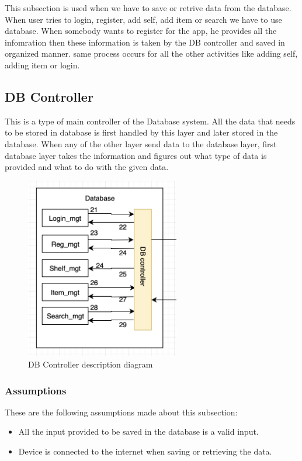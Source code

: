 This subsection is used when we have to save or retrive data from the database. When user tries to login, register, add self, add item or search we have to use database. When somebody wants to register for the app, he provides all the infomration then these information is taken by the DB controller and saved in organized manner. same process occurs for all the other activities like adding self, adding item or login.
\subsection{DB Controller}
This is a type of main controller of the Database system. All the data that needs to be stored in database is first handled by this layer and later stored in the database. When any of the other layer send data to the database layer, first database layer takes the information and figures out what type of data is provided and what to do with the given data.

\begin{figure}[h!]
	\centering
 	\includegraphics[width=0.60\textwidth]{images/dbcontroller}
 \caption{DB Controller description diagram}
\end{figure}

\subsubsection{Assumptions}
These are the following assumptions made about this subsection:
\begin{itemize}
    \item All the input provided to be saved in the database is a valid input.
    \item Device is connected to the internet when saving or retrieving the data.
\end{itemize}

